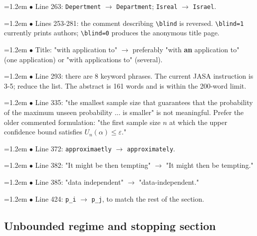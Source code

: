 \documentclass[10pt,a4paper]{article}
\begin{document}
\par\smallskip\noindent\hangindent=1.2em $\bullet$ Line 263: \texttt{Depertment} $\to$ \texttt{Department}; \texttt{Isreal} $\to$ \texttt{Israel}.
\par\smallskip\noindent\hangindent=1.2em $\bullet$ Lines 253-281: the comment describing \texttt{\textbackslash{}\allowbreak{}blind} is reversed. \texttt{\textbackslash{}\allowbreak{}blind=1} currently prints authors; \texttt{\textbackslash{}\allowbreak{}blind=0} produces the anonymous title page.
\par\smallskip\noindent\hangindent=1.2em $\bullet$ Title: "with application to" $\to$ preferably "with \textbf{an} application to" (one application) or "with applications to" (several).
\par\smallskip\noindent\hangindent=1.2em $\bullet$ Line 293: there are 8 keyword phrases. The current JASA instruction is 3-5; reduce the list. The abstract is 161 words and is within the 200-word limit.
\par\smallskip\noindent\hangindent=1.2em $\bullet$ Line 335: "the smallest sample size that guarantees that the probability of the maximum unseen probability ... is smaller" is not meaningful. Prefer the older commented formulation: "the first sample size \(n\) at which the upper confidence bound satisfies \(U_n(\alpha)\le\varepsilon\)."
\par\smallskip\noindent\hangindent=1.2em $\bullet$ Line 372: \texttt{approximaetly} $\to$ \texttt{approximately}.
\par\smallskip\noindent\hangindent=1.2em $\bullet$ Line 382: "It might be then tempting" $\to$ "It might then be tempting."
\par\smallskip\noindent\hangindent=1.2em $\bullet$ Line 385: "data independent" $\to$ "data-independent."
\par\smallskip\noindent\hangindent=1.2em $\bullet$ Line 424: \texttt{p\_\allowbreak{}i} $\to$ \texttt{p\_\allowbreak{}j}, to match the rest of the section.

\subsection*{Unbounded regime and stopping section}
\end{document}
